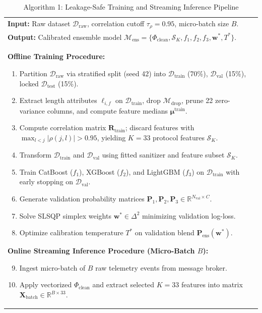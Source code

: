 \documentclass[10pt,journal,twocolumn]{IEEEtran}
\begin{document}
\begin{table}[h]
\centering
\caption{Algorithm 1: Leakage-Safe Training and Streaming Inference Pipeline}
\label{alg:training_pipeline}
\begin{tabular}{p{}}
\toprule
\textbf{Input:} Raw dataset $\mathcal{D}_{\text{raw}}$, correlation cutoff $\tau_{\rho}=0.95$, micro-batch size $B$.\\
\textbf{Output:} Calibrated ensemble model $\mathcal{M}_{\text{ens}} = \{\Phi_{\text{clean}}, \mathcal{S}_K, f_1, f_2, f_3, \mathbf{w}^*, T^*\}$.\\
\midrule
\textbf{Offline Training Procedure:}
\begin{enumerate}
    \item Partition $\mathcal{D}_{\text{raw}}$ via stratified split (seed 42) into $\mathcal{D}_{\text{train}}$ (70\%), $\mathcal{D}_{\text{val}}$ (15\%), locked $\mathcal{D}_{\text{test}}$ (15\%).
    \item Extract length attributes $\ell_{i,f}$ on $\mathcal{D}_{\text{train}}$, drop $\mathcal{M}_{\text{drop}}$, prune 22 zero-variance columns, and compute feature medians $\boldsymbol{\mu}^{\text{train}}$.
    \item Compute correlation matrix $\mathbf{R}_{\text{train}}$; discard features with $\max_{l < j} |\rho(j,l)| > 0.95$, yielding $K=33$ protocol features $\mathcal{S}_K$.
    \item Transform $\mathcal{D}_{\text{train}}$ and $\mathcal{D}_{\text{val}}$ using fitted sanitizer and feature subset $\mathcal{S}_K$.
    \item Train CatBoost ($f_1$), XGBoost ($f_2$), and LightGBM ($f_3$) on $\mathcal{D}_{\text{train}}$ with early stopping on $\mathcal{D}_{\text{val}}$.
    \item Generate validation probability matrices $\mathbf{P}_1, \mathbf{P}_2, \mathbf{P}_3 \in \mathbb{R}^{N_{\text{val}} \times C}$.
    \item Solve SLSQP simplex weights $\mathbf{w}^* \in \Delta^2$ minimizing validation log-loss.
    \item Optimize calibration temperature $T^*$ on validation blend $\mathbf{P}_{\text{ens}}(\mathbf{w}^*)$.
\end{enumerate}
\textbf{Online Streaming Inference Procedure (Micro-Batch $B$):}
\begin{enumerate}
    \setcounter{enumi}{8}
    \item Ingest micro-batch of $B$ raw telemetry events from message broker.
    \item Apply vectorized $\Phi_{\text{clean}}$ and extract selected $K=33$ features into matrix $\mathbf{X}_{\text{batch}} \in \mathbb{R}^{B \times 33}$.

\end{enumerate}
\end{tabular}
\end{table}
\end{document}
